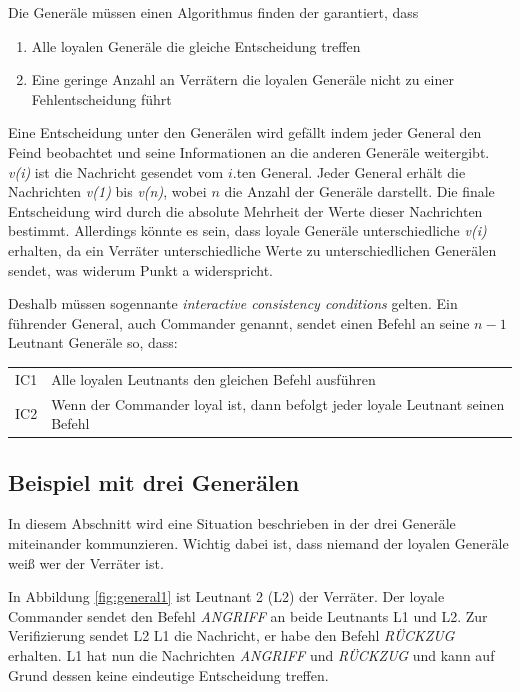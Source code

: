 \documentclass{article}
\begin{document}
\medskip 

Die Generäle müssen einen Algorithmus finden der garantiert, dass

\begin{enumerate}[label=(\alph*)]
\item Alle loyalen Generäle die gleiche Entscheidung treffen 
\item Eine geringe Anzahl an Verrätern die loyalen Generäle nicht zu einer Fehlentscheidung führt
\end{enumerate}

Eine Entscheidung unter den Generälen wird gefällt 
indem jeder General den Feind beobachtet und seine
Informationen an die anderen Generäle weitergibt. \textit{v(i)} ist die 
Nachricht gesendet vom $i$.ten General. Jeder General erhält die Nachrichten 
\textit{v(1)} bis \textit{v(n)}, wobei $n$ die Anzahl der Generäle darstellt. 
Die finale Entscheidung wird durch die absolute Mehrheit der Werte dieser Nachrichten
bestimmt. Allerdings könnte es sein, dass loyale Generäle unterschiedliche \textit{v(i)}
erhalten, da ein Verräter unterschiedliche Werte zu unterschiedlichen Generälen sendet, 
was widerum Punkt a widerspricht. 

\medskip 

Deshalb müssen sogennante \textit{interactive consistency conditions} gelten.
Ein führender General, auch Commander genannt, sendet einen Befehl an seine $n - 1$ Leutnant 
Generäle so, dass:

\smallskip 

\begin{tabular}{l l}
IC1 & Alle loyalen Leutnants den gleichen Befehl ausführen \\
IC2 & Wenn der Commander loyal ist, dann befolgt jeder loyale Leutnant seinen Befehl
\end{tabular}

\subsection{Beispiel mit drei Generälen}
In diesem Abschnitt wird eine Situation beschrieben in der drei Generäle miteinander kommunzieren. 
Wichtig dabei ist, dass niemand der loyalen Generäle weiß wer der Verräter ist. 

\medskip

In Abbildung \ref{fig:general1} ist Leutnant 2 (L2) der Verräter. Der loyale Commander
sendet den Befehl \textit{ANGRIFF} an beide Leutnants L1 und L2. Zur Verifizierung sendet L2 L1 die Nachricht,
er habe den Befehl \textit{RÜCKZUG} erhalten. 
L1 hat nun die Nachrichten \textit{ANGRIFF} und \textit{RÜCKZUG} und 
kann auf Grund dessen keine eindeutige Entscheidung treffen.
\end{document}
